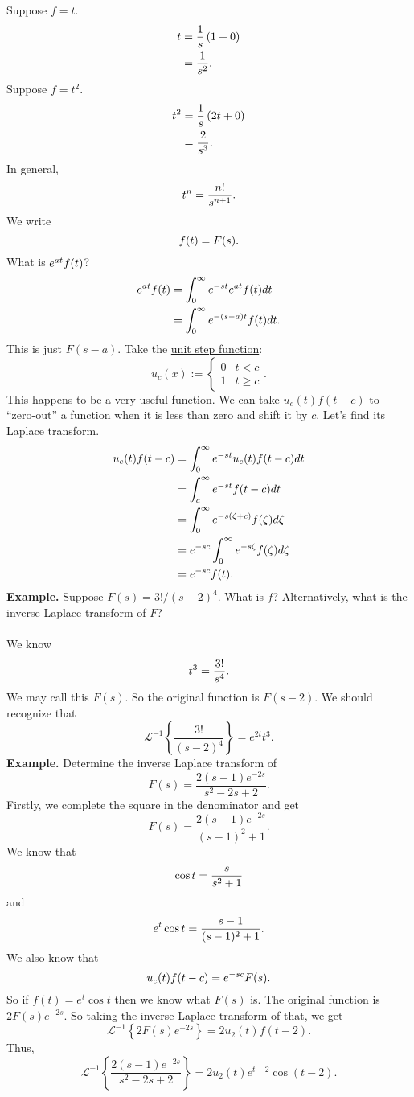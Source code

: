\documentclass[11pt, oneside]{article}   	%
\let\L\relax
\newcommand{\L}[1]{\mathcal{L}\left\{#1\right\}}
\newcommand{\Li}[1]{\mathcal{L}^{-1}\left\{#1\right\}}
\begin{document}
Suppose $f = t$.
\begin{align*}
\L{t}	&= \frac{1}{s}\left( \L{1} + 0 \right)\\
	&= \frac{1}{s^2}.
\end{align*}
Suppose $f = t^2$.
\begin{align*}
\L{t^2}	&= \frac{1}{s}\left( \L{2t} + 0 \right)\\
		&= \frac{2}{s^3}.
\end{align*}
In general, 
$$
\L{t^n} = \frac{n!}{s^{n+1}}.
$$
We write
$$
\L{f(t)} = F(s).
$$
What is $\L{e^{at}f(t)}$?
\begin{align*}
\L{e^{at}f(t)}	&= \int_0^\infty e^{-st}e^{at}f(t)dt\\
			&=  \int_0^\infty e^{-(s-a)t}f(t)dt.
\end{align*}
This is just $F(s-a)$. Take the \underline{unit step function}:
$$
u_c(x) := 
\begin{cases}
0 & t < c\\
1 & t \geqslant c
\end{cases}.
$$ %
This happens to be a very useful function. We can take $u_c(t)f(t-c)$ to ``zero-out'' a function when it is less than zero and shift it by $c$. Let's find its Laplace transform.
\begin{align*}
\L{u_c(t)f(t-c)}  	&=  \int_0^\infty e^{-st}u_c(t)f(t-c)dt\\
			&= \int_c^\infty e^{-st}f(t-c)dt\\
			&=  \int_{0}^\infty e^{-s(\zeta+c)} f(\zeta)d\zeta\\
			&= e^{-sc}\int_0^\infty e^{-s\zeta}f(\zeta)d\zeta\\
			&= e^{-sc}\L{f(t)}.
\end{align*}
\textbf{Example.} Suppose $F(s) = 3!/(s-2)^4$. What is $f$? Alternatively, what is the inverse Laplace transform of $F$?\\\\
We know
$$
\L{t^3} = \frac{3!}{s^4}.
$$
We may call this $F(s)$. So the original function is $F(s-2)$. We should recognize that
$$
\Li{\frac{3!}{(s-2)^4}} = \boxed{e^{2t}t^3.}
$$
\textbf{Example.} Determine the inverse Laplace transform of
$$
F(s) = \frac{2(s-1)e^{-2s}}{s^2 - 2s +2}.
$$
Firstly, we complete the square in the denominator and get
$$
F(s) = \frac{2(s-1)e^{-2s}}{(s-1)^2 + 1}.
$$
We know that 
$$
\L{\cos t} = \frac{s}{s^2 + 1}
$$
and 
$$
\L{e^t\cos t} = \frac{s-1}{(s-1)^2 + 1}.
$$
We also know that
$$
\L{u_c(t)f(t-c)}  = e^{-sc}F(s).
$$
So if $f(t) = e^t\cos t$ then we know what $F(s)$ is. The original function is $2F(s)e^{-2s}$. So taking the inverse Laplace transform of that, we get
$$
\Li{2F(s)e^{-2s}} = 2u_2(t)f(t-2).
$$
Thus,
$$
\Li{\frac{2(s-1)e^{-2s}}{s^2 - 2s +2}} = \boxed{2u_2(t) e^{t-2}\cos(t-2).}
$$
\end{document}
